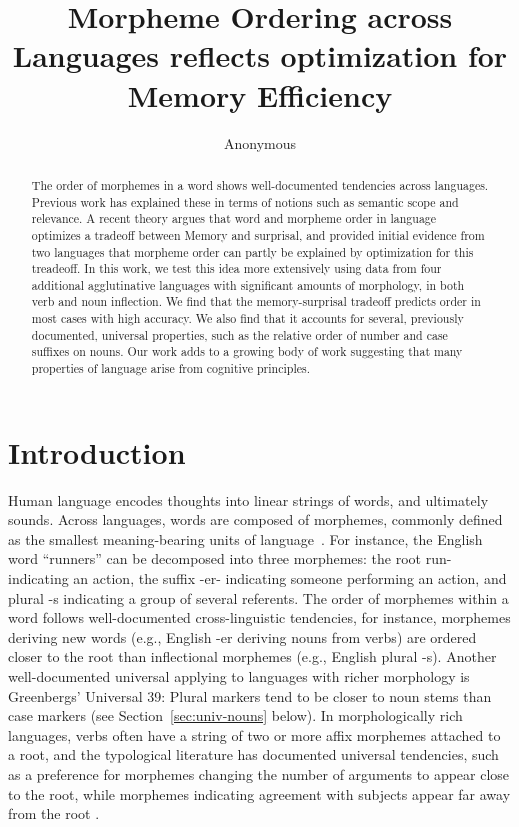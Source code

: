 \documentclass[11pt,letterpaper]{article}
\title{Morpheme Ordering across Languages reflects optimization for Memory Efficiency}
\author{Anonymous}
\newcommand{\citep}{\parencite}
\newcounter{def}
\begin{document}
\maketitle

\begin{abstract}
    The order of morphemes in a word shows well-documented tendencies across languages.
Previous work has explained these in terms of notions such as semantic scope and relevance.
A recent theory argues that word and morpheme order in language optimizes a tradeoff between Memory and surprisal, and provided initial evidence from two languages that morpheme order can partly be explained by optimization for this treadeoff.
In this work, we test this idea more extensively using data from four additional agglutinative languages with significant amounts of morphology, in both verb and noun inflection.
We find that the memory-surprisal tradeoff predicts order in most cases with high accuracy.
We also find that it accounts for several, previously documented, universal properties, such as the relative order of number and case suffixes on nouns.
Our work adds to a growing body of work suggesting that many properties of language arise from cognitive principles.
\end{abstract}




\section{Introduction}

Human language encodes thoughts into linear strings of words, and ultimately sounds.
Across languages, words are composed of morphemes, commonly defined as the smallest meaning-bearing units of language~\citep{bloomfield1926a,katamba2006morphology}.
For instance, the English word ``runners'' can be decomposed into three morphemes: the root run- indicating an action, the suffix -er- indicating someone performing an action, and plural -s indicating a group of several referents.
The order of morphemes within a word follows well-documented cross-linguistic tendencies, for instance, morphemes deriving new words (e.g., English -er deriving nouns from verbs) are ordered closer to the root than inflectional morphemes (e.g., English plural -s).
Another well-documented universal applying to languages with richer morphology is Greenbergs' Universal 39:
Plural markers tend to be closer to noun stems than case markers \citep[112]{greenberg1963universals} (see Section~\ref{sec:univ-nouns} below).
In morphologically rich languages, verbs often have a string of two or more affix morphemes attached to a root, and the typological literature has documented universal tendencies, such as a preference for morphemes changing the number of arguments to appear close to the root, while morphemes indicating agreement with subjects appear far away from the root \citep{bybee-morphology-1985}.
\end{document}
